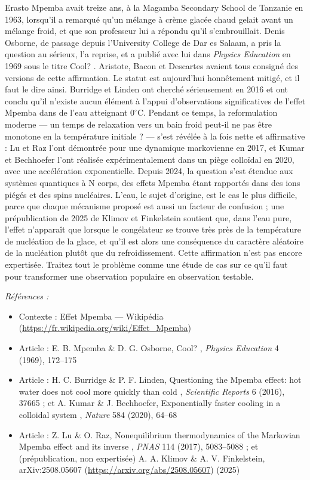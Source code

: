 \documentclass[11pt]{article}
\newenvironment{refs}{\par\small\noindent\emph{Références :}\begin{itemize}\setlength\itemsep{0pt}}{\end{itemize}\normalsize}
\begin{document}
\noindent Erasto Mpemba avait treize ans, à la Magamba Secondary School de Tanzanie
en 1963, lorsqu'il a remarqué qu'un mélange à crème glacée chaud gelait avant un mélange
froid, et que son professeur lui a répondu qu'il s'embrouillait. Denis Osborne, de passage
depuis l'University College de Dar es Salaam, a pris la question au sérieux, l'a reprise, et a
publié avec lui dans \textit{Physics Education} en 1969 sous le titre \og{} Cool? \fg{}. Aristote, Bacon
et Descartes avaient tous consigné des versions de cette affirmation. Le statut est
aujourd'hui honnêtement mitigé, et il faut le dire ainsi. Burridge et Linden ont cherché
sérieusement en 2016 et ont conclu qu'il n'existe aucun élément à l'appui d'observations
significatives de l'effet Mpemba dans de l'eau atteignant $ 0^\circ\mathrm{C} $. Pendant ce
temps, la reformulation moderne --- un temps de relaxation vers un bain froid peut-il ne pas
être monotone en la température initiale ? --- s'est révélée à la fois nette et affirmative :
Lu et Raz l'ont démontrée pour une dynamique markovienne en 2017, et Kumar et Bechhoefer l'ont
réalisée expérimentalement dans un piège colloïdal en 2020, avec une accélération
exponentielle. Depuis 2024, la question s'est étendue aux systèmes quantiques à N corps, des
effets Mpemba étant rapportés dans des ions piégés et des spins nucléaires. L'eau, le sujet
d'origine, est le cas le plus difficile, parce que chaque mécanisme proposé est aussi un
facteur de confusion ; une prépublication de 2025 de Klimov et Finkelstein soutient que, dans
l'eau pure, l'effet n'apparaît que lorsque le congélateur se trouve très près de la
température de nucléation de la glace, et qu'il est alors une conséquence du caractère
aléatoire de la nucléation plutôt que du refroidissement. Cette affirmation n'est pas encore
expertisée. Traitez tout le problème comme une étude de cas sur ce qu'il faut pour transformer
une observation populaire en observation testable.

\begin{refs}
\item Contexte : Effet Mpemba --- Wikipédia (\url{https://fr.wikipedia.org/wiki/Effet_Mpemba})
\item Article : E. B. Mpemba \& D. G. Osborne, \og{} Cool? \fg{}, \textit{Physics Education} 4 (1969), 172--175
\item Article : H. C. Burridge \& P. F. Linden, \og{} Questioning the Mpemba effect: hot water does not cool more quickly than cold \fg{}, \textit{Scientific Reports} 6 (2016), 37665 ; et A. Kumar \& J. Bechhoefer, \og{} Exponentially faster cooling in a colloidal system \fg{}, \textit{Nature} 584 (2020), 64--68
\item Article : Z. Lu \& O. Raz, \og{} Nonequilibrium thermodynamics of the Markovian Mpemba effect and its inverse \fg{}, \textit{PNAS} 114 (2017), 5083--5088 ; et (prépublication, non expertisée) A. A. Klimov \& A. V. Finkelstein, arXiv:2508.05607 (\url{https://arxiv.org/abs/2508.05607}) (2025)
\end{refs}
\end{document}

